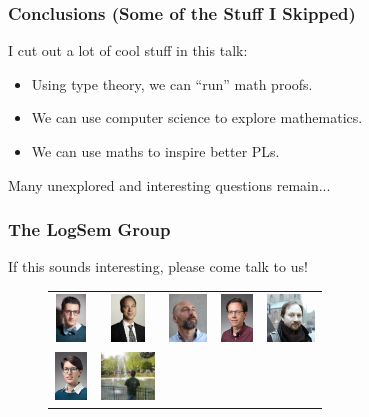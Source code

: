 \documentclass[usenames,dvipsnames,aspectratio=169,12pt]{beamer}
\begin{document}
\begin{frame}
  \frametitle{Conclusions (Some of the Stuff I Skipped)}
  I cut out a lot of cool stuff in this talk:
  \begin{itemize}
  \item Using type theory, we can ``run'' math proofs.
  \item We can use computer science to explore mathematics.
  \item We can use maths to inspire better PLs.
  \end{itemize}
  Many unexplored and interesting questions remain...
\end{frame}

\begin{frame}
  \frametitle{The LogSem Group}
  If this sounds interesting, please come talk to us!
  \begin{figure}
    \begin{tabular}{ccccc}
    {\includegraphics[height = 0.5in]{aslan.jpg}}      &
    {\includegraphics[height = 0.5in]{lars.jpg}}       &
    {\includegraphics[height = 0.5in]{bas.jpg}}        &
    {\includegraphics[height = 0.5in]{jaco.jpg}}       &
    {\includegraphics[height = 0.5in]{danil.jpg}}     \\
    {\includegraphics[height = 0.5in]{sabine.jpg}}     &
    {\includegraphics[height = 0.5in]{alix.jpg}}       &

\end{tabular}
\end{figure}
\end{frame}
\end{document}
